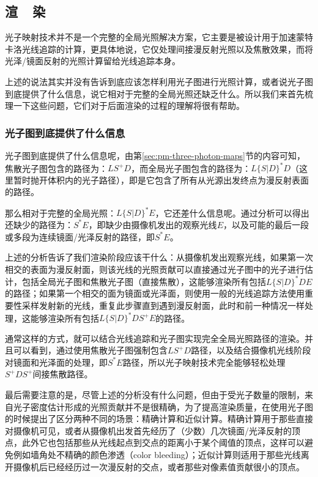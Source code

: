 \subsection{渲~~染}\label{sec:pm-rendering}
光子映射技术并不是一个完整的全局光照解决方案，它主要是被设计用于加速蒙特卡洛光线追踪的计算，更具体地说，它仅处理间接漫反射光照以及焦散效果，而将光泽/镜面反射的光照计算留给光线追踪本身。

上述的说法其实并没有告诉到底应该怎样利用光子图进行光照计算，或者说光子图到底提供了什么信息，说它相对于完整的全局光照还缺乏什么。所以我们来首先梳理一下这些问题，它们对于后面渲染的过程的理解将很有帮助。




\subsubsection{光子图到底提供了什么信息}
光子图到底提供了什么信息呢，由第\ref{sec:pm-three-photon-maps}节的内容可知，焦散光子图包含的路径为：$LS^{+}D$，而全局光子图包含的路径为：$L\{S|D\}^{*}D$（这里暂时抛开体积内的光子路径），即是它包含了所有从光源出发终点为漫反射表面的路径。

那么相对于完整的全局光照：$L\{S|D\}^{*}E$，它还差什么信息呢。通过分析可以得出还缺少的路径为：$S^{*}E$，即缺少由摄像机发出的观察光线$E$，以及可能的最后一段或多段为连续镜面/光泽反射的路径，即$S^{*}E$。

上述的分析告诉了我们渲染阶段应该干什么：从摄像机发出观察光线，如果第一次相交的表面为漫反射面，则该光线的光照贡献可以直接通过光子图中的光子进行估计，包括全局光子图和焦散光子图（直接焦散），这能够渲染所有包括$L\{S|D\}^{*}DE$的路径；如果第一个相交的面为镜面或光泽面，则使用一般的光线追踪方法使用重要性采样发射新的光线，重复此步骤直到遇到漫反射面，此时和前一种情况一样处理，这能够渲染所有包括$L\{S|D\}^{*}DS^{+}E$的路径。

通常这样的方式，就可以结合光线追踪和光子图实现完全全局光照路径的渲染。并且可以看到，通过使用焦散光子图强制包含$LS^{+}D$路径，以及结合摄像机光线阶段对镜面和光泽面的处理，即$S^{*}E$路径，所以光子映射技术完全能够轻松处理$S^{+}DS^{+}$间接焦散路径。

最后需要注意的是，尽管上述的分析没有什么问题，但由于受光子数量的限制，来自光子密度估计形成的光照贡献并不是很精确，为了提高渲染质量，\cite{a:GlobalIlluminationusingPhotonMaps}在使用光子图的时候提出了区分两种不同的场景：精确计算和近似计算。精确计算用于那些直接对摄像机可见，或者从摄像机出发首先经历了（少数）几次镜面/光泽反射的顶点，此外它也包括那些从光线起点到交点的距离小于某个阈值的顶点，这样可以避免例如墙角处不精确的颜色渗透（color bleeding）；近似计算则适用于那些光线离开摄像机后已经经历过一次漫反射的交点，或者那些对像素值贡献很小的顶点。






